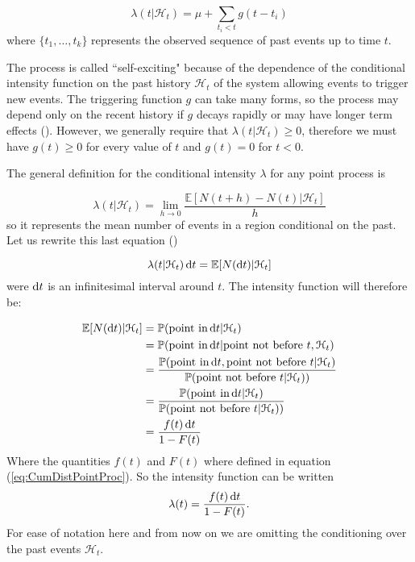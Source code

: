 \begin{equation*}
    \lambda(t|\mathcal{H}_t) = \mu + \sum_{t_i < t} g(t - t_i)
\end{equation*}
where $\{ t_1, \dots, t_k\}$ represents the observed sequence of past events up to time $t$.

The process is called ``self-exciting" because of the dependence of the conditional intensity function on the past history $\mathcal{H}_t$ of the system allowing events to trigger new events. The triggering function $g$ can take many forms, so the process may depend only on the recent history if $g$ decays rapidly or may have longer term effects (\cite{Reinhart}). However, we generally require that $\lambda(t | \mathcal{H}_t)  \geq 0$, therefore we must have $g(t) \geq 0$ for every value of $t$ and $g(t) = 0$ for $t < 0$.

The general definition for the conditional intensity $\lambda$ for any point process is

\begin{equation*}
    \lambda(t | \mathcal{H}_t) = \lim_{h \to 0} \frac{\mathbb{E}[N(t+h) - N(t) | \mathcal{H}_t]}{h}
\end{equation*}
so it represents the mean number of events in a region conditional on the past.
Let us rewrite this last equation (\cite{Rasmussen})

\begin{equation*}
    \lambda(t | \mathcal{H}_t) \operatorname{d}\!{t} = \mathbb{E}[N(\operatorname{d}\!{t}) | \mathcal{H}_t]
\end{equation*}
were $\operatorname{d}\!{t}$ is an infinitesimal interval around $t$.
The intensity function will therefore be:

\begin{align*}
    \mathbb{E}[N(\operatorname{d}\!{t}) | \mathcal{H}_t] &= \mathbb{P}(\textrm{point in} \operatorname{d}\!{t} | \mathcal{H}_t) \\
    & = \mathbb{P}(\textrm{point in} \operatorname{d}\!{t} | \textrm{point not before } t, \mathcal{H}_t) \\
    & = \frac{\mathbb{P}(\textrm{point in} \operatorname{d}\!{t}, \textrm{point not before } t | \mathcal{H}_t)}{\mathbb{P}(\textrm{point not before } t | \mathcal{H}_t))} \\
    & = \frac{\mathbb{P}(\textrm{point in} \operatorname{d}\!{t} | \mathcal{H}_t)}{\mathbb{P}(\textrm{point not before } t | \mathcal{H}_t))} \\
    & = \frac{f(t) \operatorname{d}\!{t}}{1 - F(t)}
\end{align*}
Where the quantities $f(t)$ and $F(t)$ where defined in equation (\ref{eq:CumDistPointProc}). So the intensity function can be written
\begin{equation}\label{eq:IntFun}
    \lambda(t) = \frac{f(t) \operatorname{d}\!{t}}{1 - F(t)}.
\end{equation}
For ease of notation here and from now on we are omitting the conditioning over the past events $\mathcal{H}_t$.

